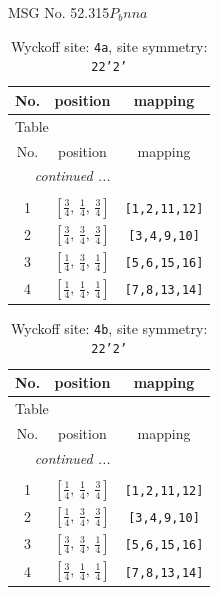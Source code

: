 \documentclass[fleqn,8pt]{jsarticle}
\begin{document}
\setcounter{MaxMatrixCols}{32}

\renewcommand{\tablename}{Table~}
\renewcommand{\figurename}{Figure~}
\begin{center}
\LARGE
MSG No. 52.315\quad$P_{b}nna$
\end{center}
\renewcommand{\arraystretch}{1.2}
\begin{longtable}{ccc}
\caption{Wyckoff site: {\tt 4a}, site symmetry: {\tt 22'2'}}
 \\
 \hline \hline
No. & position & mapping \\ \hline \endfirsthead

\multicolumn{2}{l}{\tablename\ \thetable{}} \\
 \hline \hline
No. & position & mapping \\ \hline \endhead

 \hline \hline
\multicolumn{2}{r}{\footnotesize\it continued ...} \\ \endfoot

 \hline \hline
\multicolumn{2}{r}{} \\ \endlastfoot

1 & $\left[ \frac{3}{4},\, \frac{1}{4},\, \frac{3}{4} \right]$ & {\tt [1,2,11,12]} \\ \hline
2 & $\left[ \frac{3}{4},\, \frac{3}{4},\, \frac{3}{4} \right]$ & {\tt [3,4,9,10]} \\ \hline
3 & $\left[ \frac{1}{4},\, \frac{3}{4},\, \frac{1}{4} \right]$ & {\tt [5,6,15,16]} \\ \hline
4 & $\left[ \frac{1}{4},\, \frac{1}{4},\, \frac{1}{4} \right]$ & {\tt [7,8,13,14]} \\
\end{longtable}
\renewcommand{\arraystretch}{1.2}
\begin{longtable}{ccc}
\caption{Wyckoff site: {\tt 4b}, site symmetry: {\tt 22'2'}}
 \\
 \hline \hline
No. & position & mapping \\ \hline \endfirsthead

\multicolumn{2}{l}{\tablename\ \thetable{}} \\
 \hline \hline
No. & position & mapping \\ \hline \endhead

 \hline \hline
\multicolumn{2}{r}{\footnotesize\it continued ...} \\ \endfoot

 \hline \hline
\multicolumn{2}{r}{} \\ \endlastfoot

1 & $\left[ \frac{1}{4},\, \frac{1}{4},\, \frac{3}{4} \right]$ & {\tt [1,2,11,12]} \\ \hline
2 & $\left[ \frac{1}{4},\, \frac{3}{4},\, \frac{3}{4} \right]$ & {\tt [3,4,9,10]} \\ \hline
3 & $\left[ \frac{3}{4},\, \frac{3}{4},\, \frac{1}{4} \right]$ & {\tt [5,6,15,16]} \\ \hline
4 & $\left[ \frac{3}{4},\, \frac{1}{4},\, \frac{1}{4} \right]$ & {\tt [7,8,13,14]} \\
\end{longtable}
\end{document}
